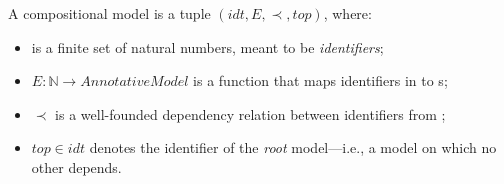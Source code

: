 \begin{definition}
\label{defn:compositional-models}
A compositional model is a tuple $\mathit{(idt, E, \prec, top)}$, where:
\begin{itemize}
    \item {} is a finite set of natural numbers, meant to be \emph{identifiers};
    \item $E: \mathbb{N} \to \mathit{AnnotativeModel}$ is a function that maps identifiers in  to s;
    \item $\prec$ is a well-founded dependency relation between identifiers from ;
    \item $\mathit{top} \in \mathit{idt}$ denotes the identifier of the \emph{root} model---i.e., a model on which no other depends.
\end{itemize}
\end{definition}


